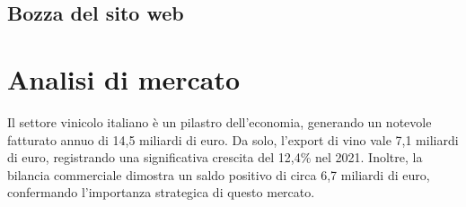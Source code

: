 \documentclass[12pt, a4paper]{article}
\begin{document}
\subsection{Bozza del sito web}
\begin{center}
\end{center}


\section{Analisi di mercato}

Il settore vinicolo italiano è un pilastro dell'economia, generando un notevole fatturato annuo di 14,5 miliardi di euro. Da solo, l'export di vino vale 7,1 miliardi di euro, registrando una significativa crescita del 12,4\% nel 2021. Inoltre, la bilancia commerciale dimostra un saldo positivo di circa 6,7 miliardi di euro, confermando l'importanza strategica di questo mercato.
\end{document}
